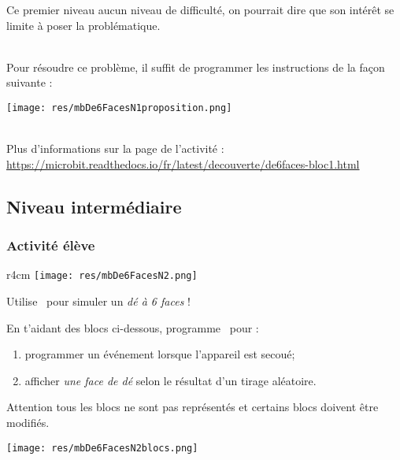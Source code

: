 Ce premier niveau aucun niveau de difficulté, on pourrait dire que son intérêt se limite à poser la problématique.



\begin{minipage}[t]{0.5\linewidth}
    \begin{methode}~\\
    Pour résoudre ce problème, il suffit de programmer les instructions de la façon suivante :
    
    \texttt{[image: res/mbDe6FacesN1proposition.png]}
    \end{methode}
\end{minipage}
\hfill
\begin{minipage}[t]{0.5\linewidth}
    \begin{remarque}
    ~\\Plus d'informations sur la page de l'activité :\\ \url{https://microbit.readthedocs.io/fr/latest/decouverte/de6faces-bloc1.html}
    \end{remarque}
\end{minipage}






%
%
\newpage
\subsection{Niveau intermédiaire}
\subsubsection{Activité élève}



\begin{eleve}
	
	
\begin{wrapfigure}[7]{r}{4cm}
	\texttt{[image: res/mbDe6FacesN2.png]}
\end{wrapfigure}

Utilise \mb~pour simuler un \emph{dé à 6 faces} !

En t'aidant des blocs ci-dessous, programme \mb~pour : 
\begin{enumerate}
    \item programmer un événement lorsque l'appareil est secoué;
    \item afficher \emph{une face de dé} selon le résultat d'un tirage aléatoire.
\end{enumerate}
Attention tous les blocs ne sont pas représentés et certains blocs doivent être modifiés.

\texttt{[image: res/mbDe6FacesN2blocs.png]}

\end{eleve}

